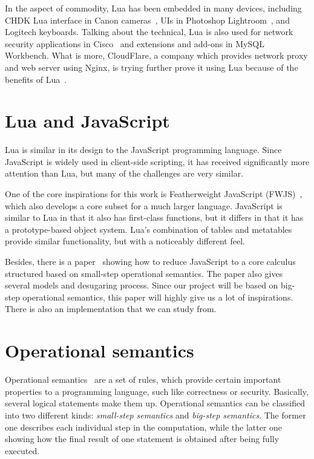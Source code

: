 In the aspect of commodity, Lua has been embedded in many devices, including CHDK Lua interface in Canon cameras~\cite{CLFL}, UIs in Photoshop Lightroom~\cite{APLL}, and Logitech keyboards. Talking about the technical, Lua is also used for network security applications in Cisco~\cite{CISCO} and extensions and add-ons in MySQL Workbench. What is more, CloudFlare, a company which provides network proxy and web server using Nginx, is trying further prove it using Lua because of the benefits of Lua~\cite{NPL}.



\section{Lua and JavaScript}
Lua is similar in its design to the JavaScript programming language.
Since JavaScript is widely used in client-side scripting,
it has received significantly more attention than Lua,
but many of the challenges are very similar.

One of the core inspirations for this work is Featherweight JavaScript (FWJS)~\cite{FWJS},
which also develops a core subset for a much larger language.
JavaScript is similar to Lua in that it also has first-class functions,
but it differs in that it has a prototype-based object system.
Lua's combination of tables and metatables provide similar functionality,
but with a noticeably different feel.

Besides, there is a paper~\cite{EOJS} showing how to reduce JavaScript to a core calculus structured based on small-step operational semantics. The paper also gives several models and desugaring process. Since our project will be based on big-step operational semantics, this paper will highly give us a lot of inspirations. There is also an implementation that we can study from.

\section{Operational semantics}
Operational semantics~\cite{AIOS} are a set of rules, which provide certain important properties to a programming language, such like correctness or security. Basically, several logical statements make them up. Operational semantics can be classified into two different kinds: \emph{small-step semantics} and \emph{big-step semantics}. The former one describes each individual step in the computation, while the latter one showing how the final result of one statement is obtained after being fully executed.

